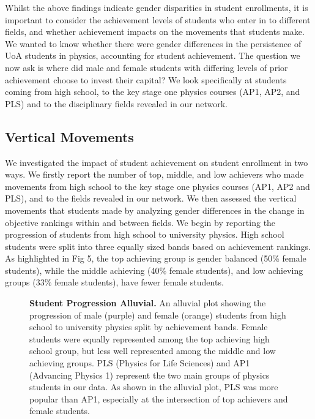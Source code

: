 Whilst the above findings indicate gender disparities in student enrollments, it is important to consider the achievement levels of students who enter in to different fields, and whether achievement impacts on the movements that students make. We wanted to know whether there were gender differences in the persistence of UoA students in physics, accounting for student achievement. The question we now ask is where did male and female students with differing levels of prior achievement choose to invest their capital? We look specifically at students coming from high school, to the key stage one physics courses (AP1, AP2, and PLS) and to the disciplinary fields revealed in our network. 

\subsection*{Vertical Movements}
We investigated the impact of student achievement on student enrollment in two ways. We firstly report the number of top, middle, and low achievers who made movements from high school to the key stage one physics courses (AP1, AP2 and PLS), and to the fields revealed in our network. We then assessed the vertical movements that students made by analyzing gender differences in the change in objective rankings within and between fields. We begin by reporting the progression of students from high school to university physics. High school students were split into three equally sized bands based on achievement rankings. As highlighted in Fig 5, the top achieving group is gender balanced (50\% female students), while the middle achieving (40\% female students), and low achieving groups (33\% female students), have fewer female students. 

\begin{figure*}[!ht]
\centering
\caption{\textbf{Student Progression Alluvial.\newline}
An alluvial plot showing the progression of male (purple) and female (orange) students from high school to university physics split by achievement bands. Female students were equally represented among the top achieving high school group, but less well represented among the middle and low achieving groups. PLS (Physics for Life Sciences) and AP1 (Advancing Physics 1) represent the two main groups of physics students in our data. As shown in the alluvial plot, PLS was more popular than AP1, especially at the intersection of top achievers and female students.}
\label{Fig5} 
\end{figure*}

